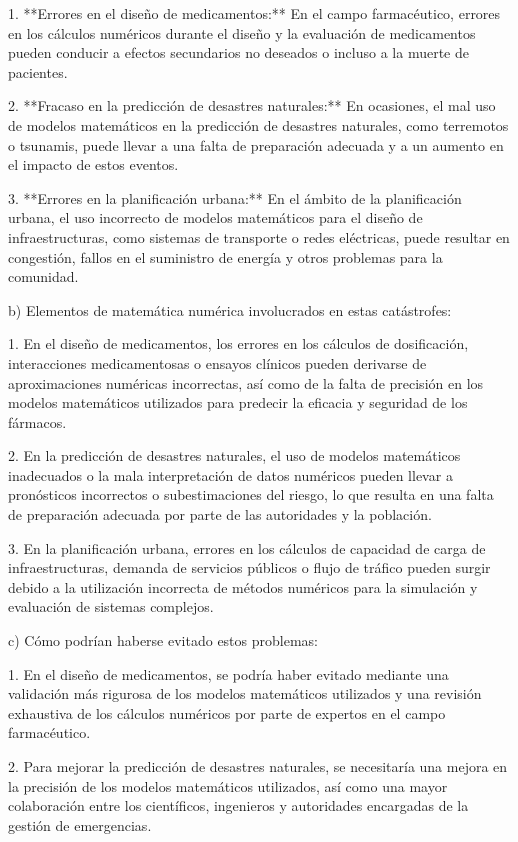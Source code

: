 \documentclass[a4paper,12pt]{article}
\begin{document}
1. **Errores en el diseño de medicamentos:** En el campo farmacéutico, errores en los cálculos numéricos durante el diseño y la evaluación de medicamentos pueden conducir a efectos secundarios no deseados o incluso a la muerte de pacientes.

2. **Fracaso en la predicción de desastres naturales:** En ocasiones, el mal uso de modelos matemáticos en la predicción de desastres naturales, como terremotos o tsunamis, puede llevar a una falta de preparación adecuada y a un aumento en el impacto de estos eventos.

3. **Errores en la planificación urbana:** En el ámbito de la planificación urbana, el uso incorrecto de modelos matemáticos para el diseño de infraestructuras, como sistemas de transporte o redes eléctricas, puede resultar en congestión, fallos en el suministro de energía y otros problemas para la comunidad.

b) Elementos de matemática numérica involucrados en estas catástrofes:

1. En el diseño de medicamentos, los errores en los cálculos de dosificación, interacciones medicamentosas o ensayos clínicos pueden derivarse de aproximaciones numéricas incorrectas, así como de la falta de precisión en los modelos matemáticos utilizados para predecir la eficacia y seguridad de los fármacos.

2. En la predicción de desastres naturales, el uso de modelos matemáticos inadecuados o la mala interpretación de datos numéricos pueden llevar a pronósticos incorrectos o subestimaciones del riesgo, lo que resulta en una falta de preparación adecuada por parte de las autoridades y la población.

3. En la planificación urbana, errores en los cálculos de capacidad de carga de infraestructuras, demanda de servicios públicos o flujo de tráfico pueden surgir debido a la utilización incorrecta de métodos numéricos para la simulación y evaluación de sistemas complejos.

c) Cómo podrían haberse evitado estos problemas:

1. En el diseño de medicamentos, se podría haber evitado mediante una validación más rigurosa de los modelos matemáticos utilizados y una revisión exhaustiva de los cálculos numéricos por parte de expertos en el campo farmacéutico.

2. Para mejorar la predicción de desastres naturales, se necesitaría una mejora en la precisión de los modelos matemáticos utilizados, así como una mayor colaboración entre los científicos, ingenieros y autoridades encargadas de la gestión de emergencias.
\end{document}
